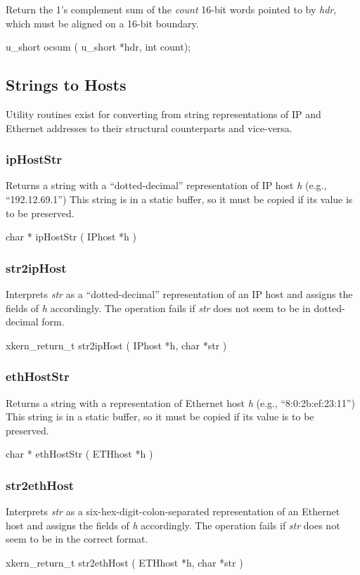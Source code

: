 Return the 1's complement sum of the {\em count} 16-bit words pointed
to by {\em hdr}, which must be aligned on a 16-bit boundary.
\medskip

{\sem u\_short} {\bold ocsum} ( {\sem u\_short} *{\caps hdr}, {\sem int} {\caps count});


\subsection{Strings to Hosts}

Utility routines exist for converting from string representations of
IP and Ethernet addresses to their structural counterparts and
vice-versa.  

\subsubsection{ipHostStr}

Returns a string with a ``dotted-decimal'' representation of IP host 
{\em h} (e.g., ``192.12.69.1'')  
This string is in a static buffer, so it must be copied if
its value is to be preserved.
\medskip

{\sem char *} {\bold ipHostStr} ( {\sem IPhost} *{\caps h} )


\subsubsection{str2ipHost}

Interprets {\em str} as a ``dotted-decimal'' 
representation of an IP host and assigns the fields of 
{\em h} accordingly.  The operation fails if {\em str} does not seem
to be in dotted-decimal form.
\medskip

{\sem xkern\_return\_t} {\bold str2ipHost} 
( {\sem IPhost} *{\caps h}, {\sem char } *{\caps str} )


\subsubsection{ethHostStr}

Returns a string with a representation of Ethernet host 
{\em h} (e.g., ``8:0:2b:ef:23:11'')  
This string is in a static buffer, so it must be copied if
its value is to be preserved.
\medskip

{\sem char *} {\bold ethHostStr} ( {\sem ETHhost} *{\caps h} )


\subsubsection{str2ethHost}

Interprets {\em str} as a six-hex-digit-colon-separated 
representation of an Ethernet host and assigns the fields of 
{\em h} accordingly.  The operation fails if {\em str} does not seem
to be in the correct format.
\medskip

{\sem xkern\_return\_t} {\bold str2ethHost} 
( {\sem ETHhost} *{\caps h}, {\sem char } *{\caps str} )

